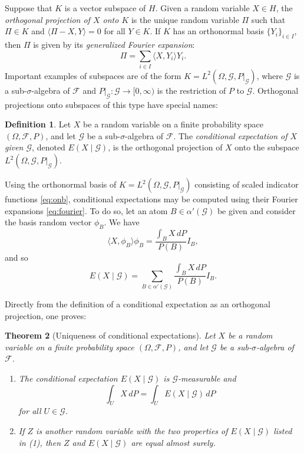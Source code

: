 \documentclass[11pt]{book}
\newtheorem{thm}{Theorem}[section]
\theoremstyle{definition}
\newtheorem{defn}[thm]{Definition}
\numberwithin{equation}{section}
\begin{document}
Suppose that $K$ is a vector subspace of $H$. Given a random variable $X\in H$, the \textit{orthogonal projection of $X$ onto $K$} is the unique random variable $\Pi$ such that $\Pi\in K$ and $\langle \Pi-X, Y \rangle = 0$ for all $Y\in K$. If $K$ has an orthonormal basis $\{Y_i\}_{i\in I}$, then $\Pi$ is given by its \textit{generalized Fourier expansion}:
\begin{equation}\label{eq:fourier}
	\Pi = \sum_{i\in I} \langle X, Y_i \rangle Y_i.
\end{equation}
Important examples of subspaces are of the form $K = L^2(\Omega, \mathcal{G}, P|_{\mathcal{G}})$, where $\mathcal{G}$ is a sub-$\sigma$-algebra of $\mathcal{F}$ and $P|_{\mathcal{G}}: \mathcal{G} \to [0,\infty)$ is the restriction of $P$ to $\mathcal{G}$. Orthogonal projections onto subspaces of this type have special names:

\begin{defn}
	Let $X$ be a random variable on a finite probability space $(\Omega, \mathcal{F}, P)$, and let $\mathcal{G}$ be a sub-$\sigma$-algebra of $\mathcal{F}$. The \textit{conditional expectation of $X$ given $\mathcal{G}$}, denoted $E(X \mid \mathcal{G})$, is the orthogonal projection of $X$ onto the subspace $L^2(\Omega, \mathcal{G}, P|_{\mathcal{G}})$.
\end{defn}

Using the orthonormal basis of $K=L^2(\Omega, \mathcal{G}, P|_{\mathcal{G}})$ consisting of scaled indicator functions \eqref{eq:onb}, conditional expectations may be computed using their Fourier expansions \eqref{eq:fourier}. To do so, let an atom $B\in \alpha'(\mathcal{G})$ be given and consider the basis random vector $\phi_B$. We have
\[
	\langle X, \phi_B \rangle \phi_B = \frac{\int_B X \, dP}{P(B)}  I_B,
\]
and so
\[
	E(X \mid \mathcal{G}) = \sum_{B \in \alpha'(\mathcal{G})} \frac{\int_B X \, dP}{P(B)}  I_B.
\]

Directly from the definition of a conditional expectation as an orthogonal projection, one proves:

\begin{thm}[Uniqueness of conditional expectations]\label{thm:orthogonality-cond-exp}
	Let $X$ be a random variable on a finite probability space $(\Omega, \mathcal{F}, P)$, and let $\mathcal{G}$ be a sub-$\sigma$-algebra of $\mathcal{F}$.
	\begin{enumerate}
		\item The conditional expectation $E(X\mid \mathcal{G})$ is $\mathcal{G}$-measurable and
		      \[
			      \int_U X \, dP = \int_U E(X\mid \mathcal{G}) \, dP
		      \]
		      for all $U\in \mathcal{G}$.
		\item If $Z$ is another random variable with the two properties of $E(X\mid \mathcal{G})$ listed in (1), then $Z$ and $E(X\mid \mathcal{G})$ are equal almost surely.
	\end{enumerate}
\end{thm}
\end{document}
